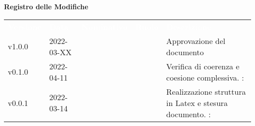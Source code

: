 

{\LARGE{\textbf{Registro delle Modifiche}}} \\
\begin{table}[!htbp]
	\renewcommand{\arraystretch}{1.5}
	\begin{tabular}{ m{}<{\centering}  m{}<{\centering}  m{}<{\centering}  m{}<{\centering}  m{}<{\centering} }
		\rowcolor{darkblue}
		\textcolor{white}{\textbf{Versione}} & \textcolor{white}{\textbf{Data}} & \textcolor{white}{\textbf{Nominativo}} & \textcolor{white}{\textbf{Ruolo}} & \textcolor{white}{\textbf{Descrizione}}                              \\
		v1.0.0                               & 2022-03-XX                       &                                        & \RE                               & Approvazione del documento                                           \\

		v0.1.0                               & 2022-04-11                       & \PV                                    & \AN                               & Verifica di coerenza e coesione complessiva. \VE: \textit{\GC}          \\

		v0.0.1                               & 2022-03-14                       & \PV                                    & \AN                               & Realizzazione struttura in Latex e stesura documento. \VE: \textit{\GC} \\
	\end{tabular}
\end{table}

\pagebreak
